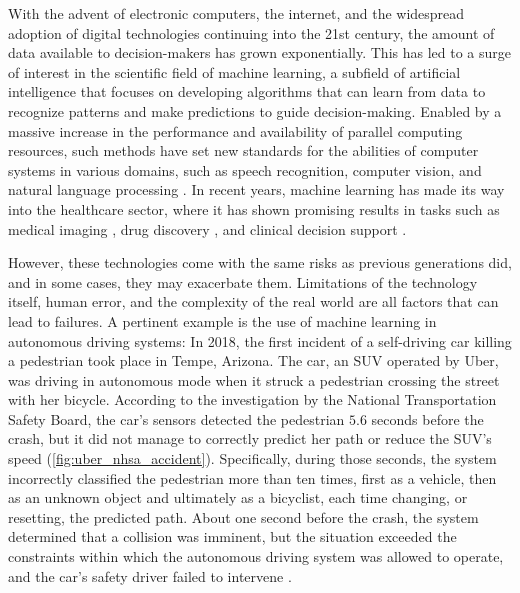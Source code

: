 With the advent of electronic computers, the internet, and the widespread adoption of digital technologies continuing into the 21st century, the amount of data available to decision-makers has grown exponentially. 
This has led to a surge of interest in the scientific field of machine learning, a subfield of artificial intelligence that focuses on developing algorithms that can learn from data to recognize patterns and make predictions to guide decision-making. 
Enabled by a massive increase in the performance and availability of parallel computing resources, such methods have set new standards for the abilities of computer systems in various domains, such as speech recognition, computer vision, and natural language processing \cite{lecun_deep_2015}. 
In recent years, machine learning has made its way into the healthcare sector, where it has shown promising results in tasks such as medical imaging \cite{lundervold_overview_2019}, drug discovery \cite{chen_rise_2018}, and clinical decision support \cite{cite15, cite14}. 

However, these technologies come with the same risks as previous generations did, and in some cases, they may exacerbate them. 
Limitations of the technology itself, human error, and the complexity of the real world are all factors that can lead to failures. A pertinent example is the use of machine learning in autonomous driving systems: 
In 2018, the first incident of a self-driving car killing a pedestrian took place in Tempe, Arizona. 
The car, an SUV operated by Uber, was driving in autonomous mode when it struck a pedestrian crossing the street with her bicycle. 
According to the investigation by the National Transportation Safety Board, the car's sensors detected the pedestrian $5.6$ seconds before the crash, but it did not manage to correctly predict her path or reduce the SUV's speed (\cref{fig:uber_nhsa_accident}). 
Specifically, during those seconds, the system incorrectly classified the pedestrian more than ten times, first as a vehicle, then as an unknown object and ultimately as a bicyclist, each time changing, or resetting, the predicted path. 
About one second before the crash, the system determined that a collision was imminent, but the situation exceeded the constraints within which the autonomous driving system was allowed to operate, and the car's safety driver failed to intervene \cite{nationaltransportationsafetyboardnhsa_collision_2019}. 

